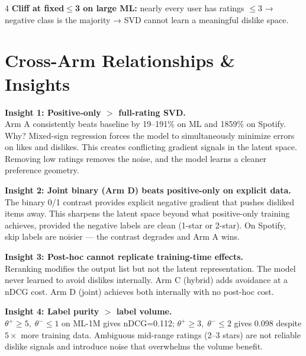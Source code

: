 \documentclass[9pt,a4paper,landscape]{article}
\newcommand{\thr}[2]{$\theta^+\!\geq\!#1,\;\theta^-\!\leq\!#2$}
\begin{document}
\begin{multicols}{4}
\vspace{2pt}
\textbf{Cliff at fixed$\leq$3 on large ML:} nearly every user has ratings $\leq$3 → negative class is the majority → SVD cannot learn a meaningful dislike space.

\section{Cross-Arm Relationships \& Insights}

\begin{mdframed}[backgroundcolor=arma!10,linewidth=0.4pt]
\textbf{Insight 1: Positive-only $>$ full-rating SVD.}\\
Arm A consistently beats baseline by 19–191\% on ML and 1859\% on Spotify. Why? Mixed-sign regression forces the model to simultaneously minimize errors on likes and dislikes. This creates conflicting gradient signals in the latent space. Removing low ratings removes the noise, and the model learns a cleaner preference geometry.
\end{mdframed}

\begin{mdframed}[backgroundcolor=armd!10,linewidth=0.4pt]
\textbf{Insight 2: Joint binary (Arm D) beats positive-only on explicit data.}\\
The binary 0/1 contrast provides explicit negative gradient that pushes disliked items away. This sharpens the latent space beyond what positive-only training achieves, provided the negative labels are clean (1-star or 2-star). On Spotify, skip labels are noisier — the contrast degrades and Arm A wins.
\end{mdframed}

\begin{mdframed}[backgroundcolor=armc!10,linewidth=0.4pt]
\textbf{Insight 3: Post-hoc cannot replicate training-time effects.}\\
Reranking modifies the output list but not the latent representation. The model never learned to avoid dislikes internally. Arm C (hybrid) adds avoidance at a nDCG cost. Arm D (joint) achieves both internally with no post-hoc cost.
\end{mdframed}

\begin{mdframed}[backgroundcolor=armb!10,linewidth=0.4pt]
\textbf{Insight 4: Label purity $>$ label volume.}\\
\thr{5}{1} on ML-1M gives nDCG=0.112; \thr{3}{2} gives 0.098 despite $5\times$ more training data. Ambiguous mid-range ratings (2–3 stars) are not reliable dislike signals and introduce noise that overwhelms the volume benefit.
\end{mdframed}


\end{multicols}
\end{document}
